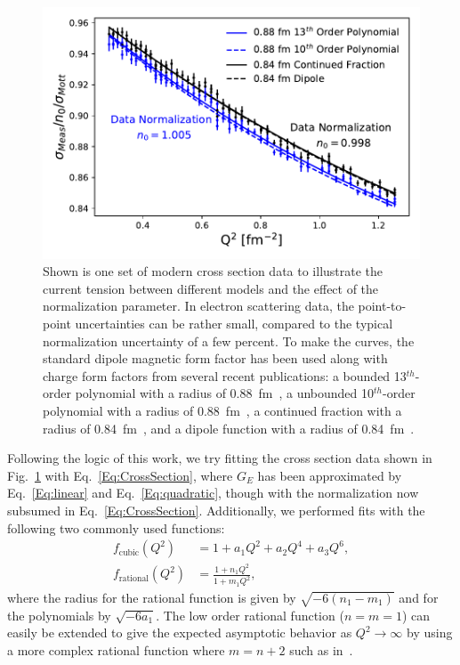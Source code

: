 \documentclass[10pt,superscriptaddress,aps,prc,twocolumn]{revtex4-1}
\begin{document}
\begin{figure}
\includegraphics[width=\columnwidth]{Figure/RealData.pdf} 
\caption{Shown is one set of modern cross section data to illustrate the current tension between 
different models and the effect of the normalization parameter.   In electron scattering data, the
point-to-point uncertainties can be rather small, compared to the typical normalization uncertainty
of a few percent.   To make the curves, the standard dipole magnetic
form factor has been used along with charge form factors from several recent publications:  a bounded
13$^{th}$-order polynomial with a radius of 0.88~fm~\cite{Ye:2017gyb}, a unbounded 10$^{th}$-order polynomial with a radius of 0.88~fm~\cite{Bernauer:2013tpr}, 
a continued fraction with a radius of 0.84~fm~\cite{Griffioen:2015hta}, and a dipole function with a radius of 0.84~fm~\cite{Higinbotham:2015rja}. }
\label{RealData}
\end{figure}

Following the logic of this work, we try fitting the cross section data shown in Fig.~\ref{RealData} with  Eq.~\ref{Eq:CrossSection}, where
$G_E$ has been approximated by Eq.~\ref{Eq:linear} and Eq.~\ref{Eq:quadratic}, though with the normalization now subsumed in Eq.~\ref{Eq:CrossSection}.    
Additionally, we performed fits with the following two commonly used functions:
\begin{align}
f_{\mathrm{cubic}}(Q^2)   & = 1 + a_1 Q^2 + a_2 Q^4 + a_3 Q^6,  \\
f_{\mathrm{rational}}(Q^2) & = \frac{1+n_1 Q^2}{1+m_1 Q^2},
\end{align}
where the radius for the rational function is given by $\sqrt{-6 (n_1 - m_1)}$ and for the polynomials by $\sqrt{-6 a_1}$.
The low order rational function ($n=m=1$) can easily be extended to give the expected asymptotic behavior
as $Q^2 \to \infty$ by using a more complex rational function where $m=n+2$ such 
as in~\cite{Kelly:2004hm,Puckett:2017flj,Gutsche:2017lyu}.
\end{document}
